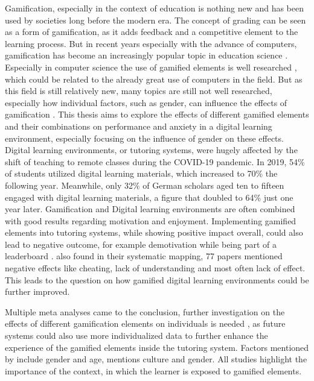 Gamification, especially in the context of education is nothing new and has been used by societies long before the modern era.
The concept of grading can be seen as a form of gamification, as it adds feedback and a competitive element to the learning process.
But in recent years especially with the advance of computers, gamification has become an increasingly popular topic in education science \parencite{swachaStateResearchGamification2021}.
Especially in computer science the use of gamified elements is well researched \parencite{dichevGamifyingEducationWhat2017}, which could be related to the already great use of computers in the field.
But as this field is still relatively new, many topics are still not well researched, especially how individual factors, such as gender, can influence the effects of gamification \parencite{dehghanzadehUsingGamificationSupport2024,oliveiraTailoredGamificationEducation2023}.
This thesis aims to explore the effects of different gamified elements and their combinations on performance and anxiety in a digital learning environment, especially focusing on the influence of gender on these effects.
Digital learning environments, or tutoring systems, were hugely affected by the shift of teaching to remote classes during the COVID-19 pandemic.
In 2019, 54\% of students utilized digital learning materials, which increased to 70\% the following year. Meanwhile, only 32\% of German scholars aged ten to fifteen engaged with digital learning materials, a figure that doubled to 64\% just one year later.
Gamification and Digital learning environments are often combined \parencite{gonzalezGamificationIntelligentTutoring2014} with good results \parencite{jacksonMotivationPerformanceGamebased2013} regarding motivation and enjoyment.
Implementing gamified elements into tutoring systems, while showing positive impact overall, could also lead to negative outcome, for example demotivation while being part of a leaderboard \parencite{almeidaSystematicMappingNegative2021}.
\textcite{almeidaSystematicMappingNegative2021} also found in their systematic mapping, 77 papers mentioned negative effects like cheating, lack of understanding and most often lack of effect.
This leads to the question on how gamified digital learning environments could be further improved.

Multiple meta analyses came to the conclusion, further investigation on the effects of different gamification elements on individuals is needed \textcite{oliveiraTailoredGamificationEducation2023,dehghanzadehUsingGamificationSupport2024,hamariDoesGamificationWork2014}, as future systems could also use more individualized data to further enhance the experience of the gamified elements inside the tutoring system.
Factors mentioned by \textcite{dehghanzadehUsingGamificationSupport2024} include gender and age, \textcite{oliveiraTailoredGamificationEducation2023} mentions culture and gender. All studies highlight the importance of the context, in which the learner is exposed to gamified elements.

